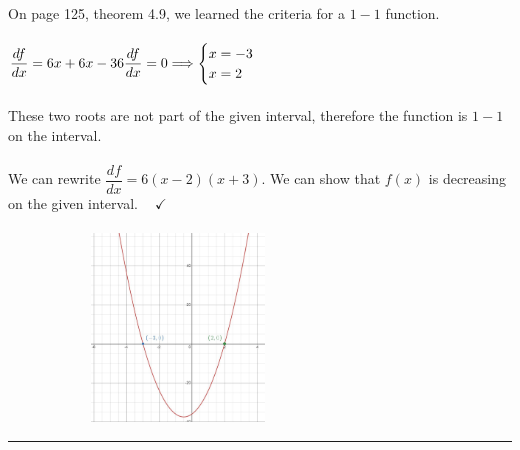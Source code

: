 \documentclass[fleqn]{article}
\begin{document}
\begin{enumerate}
      \textcolor{hwColor}{
        On page 125, theorem 4.9, we learned the criteria for a $1-1$ function.
        \\
        \\
        $
          \dfrac{df}{dx}=6x+6x-36
          \\
          \\
          \dfrac{df}{dx}=0 \Longrightarrow \begin{cases}
            x=-3
            \\
            x=2
          \end{cases}
        $
        \\
        \\
        These two roots are not part of the given interval, therefore the function is $1-1$ on the interval. 
        \\
        \\
        We can rewrite $\dfrac{df}{dx}=6(x-2)(x+3)$. We can show that $f(x)$ is decreasing on the given interval. $~~~~ \checkmark$ 
        \\
        \\
        \includegraphics[height=5cm, width=9cm]{one.JPG}
      }

  \end{enumerate}

  \rule{15cm}{1pt}
\end{document}
